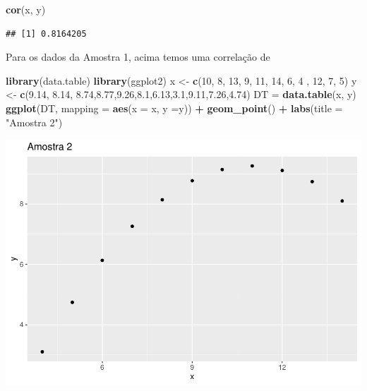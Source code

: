 \documentclass[
]{book}
\newenvironment{Shaded}{\begin{snugshade}}{\end{snugshade}}
\newcommand{\AttributeTok}[1]{\textcolor[rgb]{0.13,0.29,0.53}{#1}}
\newcommand{\DecValTok}[1]{\textcolor[rgb]{0.00,0.00,0.81}{#1}}
\newcommand{\FloatTok}[1]{\textcolor[rgb]{0.00,0.00,0.81}{#1}}
\newcommand{\FunctionTok}[1]{\textcolor[rgb]{0.13,0.29,0.53}{\textbf{#1}}}
\newcommand{\NormalTok}[1]{#1}
\newcommand{\OtherTok}[1]{\textcolor[rgb]{0.56,0.35,0.01}{#1}}
\newcommand{\SpecialCharTok}[1]{\textcolor[rgb]{0.81,0.36,0.00}{\textbf{#1}}}
\newcommand{\StringTok}[1]{\textcolor[rgb]{0.31,0.60,0.02}{#1}}
\begin{document}
\begin{Shaded}
\begin{Highlighting}[]
\FunctionTok{cor}\NormalTok{(x, y)  }
\end{Highlighting}
\end{Shaded}

\begin{verbatim}
## [1] 0.8164205
\end{verbatim}

Para os dados da Amostra 1, acima temos uma correlação de

\begin{Shaded}
\begin{Highlighting}[]
\FunctionTok{library}\NormalTok{(data.table)}
\FunctionTok{library}\NormalTok{(ggplot2)}
\NormalTok{x }\OtherTok{\textless{}{-}} \FunctionTok{c}\NormalTok{(}\DecValTok{10}\NormalTok{, }\DecValTok{8}\NormalTok{, }\DecValTok{13}\NormalTok{, }\DecValTok{9}\NormalTok{, }\DecValTok{11}\NormalTok{, }\DecValTok{14}\NormalTok{, }\DecValTok{6}\NormalTok{, }\DecValTok{4}\NormalTok{ , }\DecValTok{12}\NormalTok{, }\DecValTok{7}\NormalTok{, }\DecValTok{5}\NormalTok{)}
\NormalTok{y }\OtherTok{\textless{}{-}} \FunctionTok{c}\NormalTok{(}\FloatTok{9.14}\NormalTok{, }\FloatTok{8.14}\NormalTok{, }\FloatTok{8.74}\NormalTok{,}\FloatTok{8.77}\NormalTok{,}\FloatTok{9.26}\NormalTok{,}\FloatTok{8.1}\NormalTok{,}\FloatTok{6.13}\NormalTok{,}\FloatTok{3.1}\NormalTok{,}\FloatTok{9.11}\NormalTok{,}\FloatTok{7.26}\NormalTok{,}\FloatTok{4.74}\NormalTok{)}
\NormalTok{DT }\OtherTok{=} \FunctionTok{data.table}\NormalTok{(x, y)}
\FunctionTok{ggplot}\NormalTok{(DT, }\AttributeTok{mapping =} \FunctionTok{aes}\NormalTok{(}\AttributeTok{x =}\NormalTok{ x, }\AttributeTok{y =}\NormalTok{y)) }\SpecialCharTok{+}
  \FunctionTok{geom\_point}\NormalTok{() }\SpecialCharTok{+}
  \FunctionTok{labs}\NormalTok{(}\AttributeTok{title =} \StringTok{"Amostra 2"}\NormalTok{)}
\end{Highlighting}
\end{Shaded}

\includegraphics{_main_files/figure-latex/unnamed-chunk-9-1.pdf}

  
\end{document}
